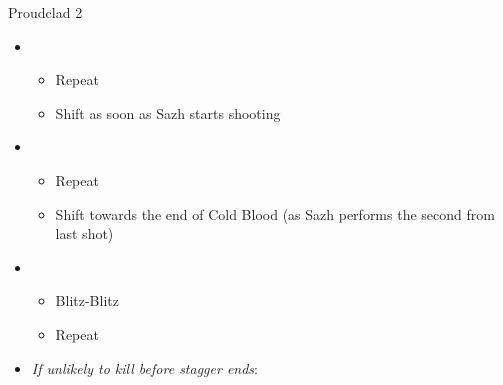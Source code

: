 \begin{battle}[2:03]{Proudclad 2}
\begin{itemize}
\begin{itemize}
				      \item Auto-chain one spell
				      \item \textit{Oneiric Maelstrom}:
				            \begin{itemize}
					            \item Renew to prevent Sazh from getting launched
					            \item Auto-chain 2 spells
					            \item Cold Blood
				            \end{itemize}
				      \item \textit{Muon Blaster $\rightarrow$ Oneiric Maelstrom}
				            \begin{itemize}
					            \item Renew to prevent Sazh from getting launched
					            \item Cold Blood
				            \end{itemize}
				      \item \textit{Muon Blaster $\rightarrow$ Muon Blaster}
				            \begin{itemize}
					            \item Cold Blood to prevent Sazh's interruption
				            \end{itemize}
				      \item Shift towards the end of Cold Blood, try to not let Snow do another Steelguard
			      \end{itemize}
			\item \fifth
			      \begin{itemize}
				      \item Repeat
				      \item Shift as soon as Sazh starts shooting
			      \end{itemize}
			\item \first
			      \begin{itemize}
				      \item Repeat
				      \item Shift towards the end of Cold Blood (as Sazh performs the second from last shot)
			      \end{itemize}
			\item \second
			      \begin{itemize}
				      \item Blitz-Blitz
				      \item Repeat
			      \end{itemize}
			\item \textit{If unlikely to kill before stagger ends}:

\end{itemize}
\end{battle}
